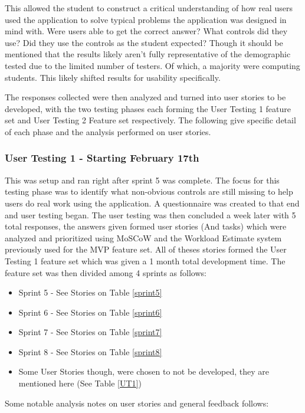 This allowed the student to construct a critical understanding of how real users used the application to solve typical problems the application was designed in mind with. Were users able to get the correct answer? What controls did they use? Did they use the controls as the student expected? Though it should be mentioned that the results likely aren't fully representative of the demographic tested due to the limited number of testers. Of which, a majority were computing students. This likely shifted results for usability specifically.

The responses collected were then analyzed and turned into user stories to be developed, with the two testing phases each forming the User Testing 1 feature set and User Testing 2 Feature set respectively. The following give specific detail of each phase and the analysis performed on user stories.

\subsubsection{User Testing 1 - Starting February 17th}
This was setup and ran right after sprint 5 was complete. The focus for this testing phase was to identify what non-obvious controls are still missing to help users do real work using the application. A questionnaire was created to that end and user testing began.
The user testing was then concluded a week later with 5 total responses, the answers given formed user stories (And tasks) which were analyzed and prioritized using MoSCoW and the Workload Estimate system previously used for the MVP feature set. All of theses stories formed the User Testing 1 feature set which was given a 1 month total development time. The feature set was then divided among 4 sprints as follows:

\begin{itemize}
    \item Sprint 5 - See Stories on Table \ref{sprint5}
    \item Sprint 6 - See Stories on Table \ref{sprint6}
    \item Sprint 7 - See Stories on Table \ref{sprint7}
    \item Sprint 8 - See Stories on Table \ref{sprint8}
    \item Some User Stories though, were chosen to not be developed, they are mentioned here (See Table \ref{UT1})
\end{itemize}

Some notable analysis notes on user stories and general feedback follows:

